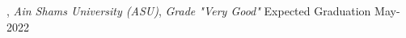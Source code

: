 
, \textit{Ain Shams University (ASU)}, \textit{  Grade "Very Good"} \hfill Expected Graduation May-2022





